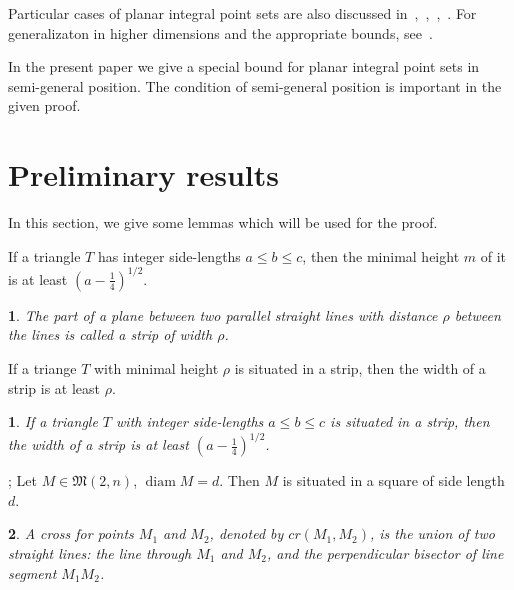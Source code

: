 \documentclass[11pt,twoside,draft
]{article}
\newtheorem{Definition}{\indent {\sc Definition}}
\newtheorem{Corollary}{\indent {\sc Corollary}}
\renewcommand*{\&}{\textbackslash \symbol{38}}%
\begin{document}
Particular cases of planar integral point sets are also discussed
in~\cite[\S 5.11]{brass2006research},~\cite[\S D20]{guy2013unsolved},~\cite{our-pmm-2018},~\cite{our-ped-2018}.
For generalizaton in higher dimensions and the appropriate bounds, see~\cite{kurz2005characteristic,nozaki2013lower}.

In the present paper we give a special bound for planar integral point sets in semi-general position.
The condition of semi-general position is important in the given proof.



\section{Preliminary results}

In this section, we give some lemmas which will be used for the proof.


\begin{lemma}
	\cite[Observation 1]{solymosi2003note}
	If a triangle $T$ has integer side-lengths $a \leq b \leq c$,
	then the minimal height $m$ of it is at least $\left(a - \frac{1}{4}\right)^{1/2}$.
\end{lemma}

\begin{Definition}
	The part of a plane between two parallel straight lines with distance $\rho$ between the lines
	is called a strip of width $\rho$.
\end{Definition}

\begin{lemma}
	\cite{smurov1998stripcoverings}
	If a triange $T$ with minimal height $\rho$ is situated in a strip,
	then the width of a strip is at least $\rho$.
\end{lemma}

\begin{Corollary}
	\label{cor:solymosi_strip}
	If a triangle $T$ with integer side-lengths $a \leq b \leq c$ is situated in a strip,
	then the width of a strip is at least $\left(a - \frac{1}{4}\right)^{1/2}$.
\end{Corollary}


\begin{lemma}
	\cite[Lemma 4]{our-vmmsh-2018};
	\cite[Lemma 2.4]{my-pps-linear-bound-2019}
	\label{lem:square_container}
	Let $M\in\mathfrak{M}(2,n)$, $\operatorname{diam} M = d$.
	Then $M$ is situated in a square of side length $d$.
\end{lemma}

\begin{Definition}
	\cite[Definition 2.5]{my-pps-linear-bound-2019}
	A \textit{cross} for points $M_1$ and $M_2$, denoted by $cr(M_1,M_2)$, is the union of two straight lines:
	the line through $M_1$ and $M_2$,
	and the perpendicular bisector of line segment $M_1 M_2$.
\end{Definition}
\end{document}
